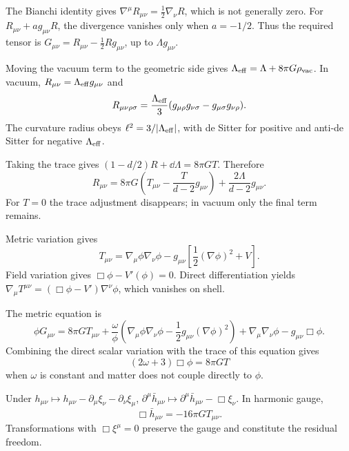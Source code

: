 \begin{solutions}

\begin{solution}
The Bianchi identity gives
\(\nabla^\mu R_{\mu\nu}=\tfrac12\nabla_\nu R\), which is not generally zero.
For \(R_{\mu\nu}+ag_{\mu\nu}R\), the divergence vanishes only when
\(a=-1/2\).  Thus the required tensor is
\(G_{\mu\nu}=R_{\mu\nu}-\tfrac12Rg_{\mu\nu}\), up to
\(\Lambda g_{\mu\nu}\).
\end{solution}

\begin{solution}
Moving the vacuum term to the geometric side gives
\(\Lambda_{\rm eff}=\Lambda+8\pi G\rho_{\rm vac}\).  In vacuum,
\(R_{\mu\nu}=\Lambda_{\rm eff}g_{\mu\nu}\) and
\[
R_{\mu\nu\rho\sigma}
=\frac{\Lambda_{\rm eff}}3
(g_{\mu\rho}g_{\nu\sigma}-g_{\mu\sigma}g_{\nu\rho}).
\]
The curvature radius obeys \(\ell^2=3/|\Lambda_{\rm eff}|\), with de Sitter
for positive and anti-de Sitter for negative \(\Lambda_{\rm eff}\).
\end{solution}

\begin{solution}
Taking the trace gives
\((1-d/2)R+\dd\Lambda=8\pi GT\).  Therefore
\[
R_{\mu\nu}
=8\pi G\left(T_{\mu\nu}-\frac{T}{d-2}g_{\mu\nu}\right)
+\frac{2\Lambda}{d-2}g_{\mu\nu}.
\]
For \(T=0\) the trace adjustment disappears; in vacuum only the final term
remains.
\end{solution}

\begin{solution}
Metric variation gives
\[
T_{\mu\nu}
=\nabla_\mu\phi\nabla_\nu\phi
-g_{\mu\nu}\left[\frac12(\nabla\phi)^2+V\right].
\]
Field variation gives
\(\Box\phi-V'(\phi)=0\).  Direct differentiation yields
\(\nabla_\mu T^{\mu\nu}
=(\Box\phi-V')\nabla^\nu\phi\), which vanishes on shell.
\end{solution}

\begin{solution}
The metric equation is
\[
\phi G_{\mu\nu}
=8\pi G T_{\mu\nu}
+\frac{\omega}{\phi}
\left(\nabla_\mu\phi\nabla_\nu\phi
-\frac12g_{\mu\nu}(\nabla\phi)^2\right)
+\nabla_\mu\nabla_\nu\phi-g_{\mu\nu}\Box\phi.
\]
Combining the direct scalar variation with the trace of this equation gives
\[
(2\omega+3)\Box\phi=8\pi G T
\]
when \(\omega\) is constant and matter does not couple directly to \(\phi\).
\end{solution}

\begin{solution}
Under
\(h_{\mu\nu}\mapsto h_{\mu\nu}-\partial_\mu\xi_\nu-\partial_\nu\xi_\mu\),
\(\partial^\mu\bar h_{\mu\nu}\mapsto
\partial^\mu\bar h_{\mu\nu}-\Box\xi_\nu\).
In harmonic gauge,
\[
\Box\bar h_{\mu\nu}=-16\pi G T_{\mu\nu}.
\]
Transformations with \(\Box\xi^\mu=0\) preserve the gauge and constitute the
residual freedom.
\end{solution}


\end{solutions}
